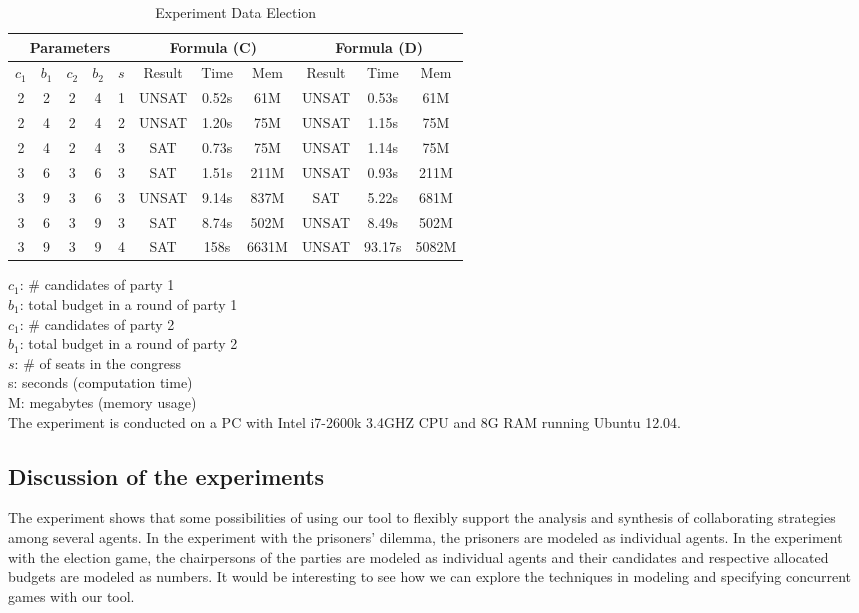 \documentclass[11pt]{article}
\begin{document}
\begin{table*}[!th]
\caption{Experiment Data Election}
\label{tab.exp.vote}
\begin{center}
\begin{tabular}{c|c|c|c|c||c|c|c||c|c|c} \hline
\multicolumn{5}{c||}{Parameters}
&\multicolumn{3}{c||}{Formula (C)} 
& \multicolumn{3}{c}{Formula (D)}\\ \hline
$c_1$ & $b_1$ & $c_2$ & $b_2$ & $s$ & Result & Time & Mem & Result & Time & Mem\\ \hline
2&2 &2 &4 &1 &UNSAT &0.52s &61M  &UNSAT &0.53s &61M \\
2&4 &2 &4 &2 &UNSAT &1.20s &75M  &UNSAT &1.15s &75M \\
2&4 &2 &4 &3 &SAT   &0.73s &75M  &UNSAT &1.14s &75M \\
3&6 &3 &6 &3 &SAT   &1.51s &211M &UNSAT &0.93s &211M \\
3&9 &3 &6 &3 &UNSAT &9.14s &837M &SAT   &5.22s &681M \\
3&6 &3 &9 &3 &SAT   &8.74s &502M &UNSAT &8.49s &502M \\
3&9 &3 &9 &4 &SAT   &158s  &6631M&UNSAT &93.17s&5082M \\ \hline
\end{tabular}
\hspace*{2mm}
\parbox{75mm}{
$c_1$: \# candidates of party 1\\
$b_1$: total budget in a round of party 1\\
$c_1$: \# candidates of party 2\\
$b_1$: total budget in a round of party 2\\
$s$: \# of seats in the congress\\[2mm] 
s: seconds (computation time)\\
M: megabytes (memory usage) \\[2mm]
The experiment is conducted on a PC with Intel i7-2600k 3.4GHZ CPU 
and 8G RAM running Ubuntu 12.04. 
}
\end{center}
\end{table*}

\subsection{Discussion of the experiments \label{subsec.exp.disc}} 

The experiment shows that some possibilities of using our tool to flexibly support the analysis 
and synthesis of collaborating strategies among several agents. 
In the experiment with the prisoners' dilemma, 
the prisoners are modeled as individual agents.  
In the experiment with the election game, 
the chairpersons of the parties are modeled as individual agents 
and  their candidates and respective allocated budgets are modeled as numbers.  
It would be interesting to see how we can explore the techniques in modeling and specifying 
concurrent games with our tool.  
\end{document}
